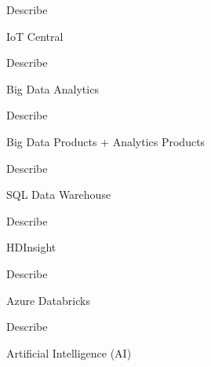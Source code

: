 \documentclass{scrartcl}
\newenvironment{flashcard}[2][]{%
    #1
    \vfill
    \centerline{\Large{#2}}
    \vfill
    \newpage
}
{\newpage}
\begin{document}
    \begin{flashcard}[Describe]{IoT Central}

    \end{flashcard}

    \begin{flashcard}[Describe]{Big Data Analytics}

    \end{flashcard}

    \begin{flashcard}[Describe]{Big Data Products + Analytics Products}

    \end{flashcard}

    \begin{flashcard}[Describe]{SQL Data Warehouse}

    \end{flashcard}

    \begin{flashcard}[Describe]{HDInsight}

    \end{flashcard}

    \begin{flashcard}[Describe]{Azure Databricks}

    \end{flashcard}

    \begin{flashcard}[Describe]{Artificial Intelligence (AI)}

    \end{flashcard}
\end{document}

